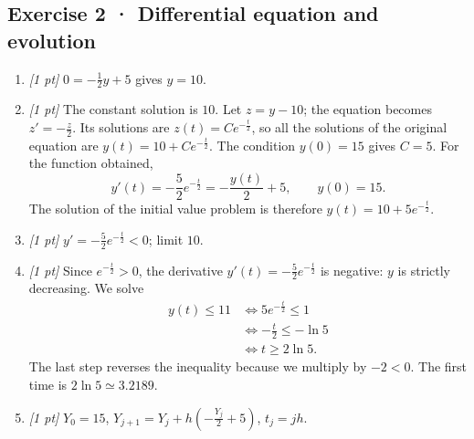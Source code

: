 \subsection*{Exercise 2 · Differential equation and evolution}\begin{enumerate}

\item \textit{[1 pt]} $0=-\frac{1}{2}y+5$ gives $y=10$.

\item \textit{[1 pt]} The constant solution is $10$. Let $z=y-10$; the equation becomes $z'=-\frac{z}{2}$. Its solutions are $z(t)=Ce^{-\frac{t}{2}}$, so all the solutions of the original equation are $y(t)=10+Ce^{-\frac{t}{2}}$.
The condition $y(0)=15$ gives $C=5$. For the function obtained,
\[y'(t)=-\frac{5}{2}e^{-\frac{t}{2}}=-\frac{y(t)}{2}+5,\qquad y(0)=15.\]
The solution of the initial value problem is therefore $y(t)=10+5e^{-\frac{t}{2}}$.

\item \textit{[1 pt]} $y'=-\frac{5}{2}e^{-\frac{t}{2}}<0$; limit $10$.

\item \textit{[1 pt]} Since $e^{-\frac{t}{2}}>0$, the derivative $y'(t)=-\frac{5}{2}e^{-\frac{t}{2}}$ is negative: $y$ is strictly decreasing. We solve
\[\begin{aligned}y(t)\le 11&\Longleftrightarrow 5e^{-\frac{t}{2}}\le1\\&\Longleftrightarrow -\frac{t}{2}\le-\ln 5\\&\Longleftrightarrow t\ge 2\ln 5.\end{aligned}\]
The last step reverses the inequality because we multiply by $-2<0$. The first time is $2\ln 5\simeq\num{3,2189}$.

\item \textit{[1 pt]} $Y_0=15$, $Y_{j+1}=Y_j+h(-\frac{Y_j}{2}+5)$, $t_j=jh$.

\end{enumerate}

